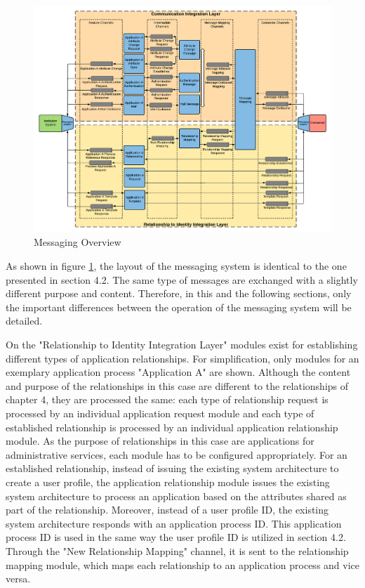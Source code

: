 \begin{figure}[h]
    \centering
    \includegraphics[scale=0.45]{Diagrams/Integration Architecture 2/Technological Integration/2. Messaging Overview.pdf}
    \caption{Messaging Overview}
    \label{integration2:messaging_overview}
\end{figure}

As shown in figure \ref{integration2:messaging_overview}, the layout of the messaging system is identical to the one presented in section 4.2. The same type of messages are exchanged with a slightly different purpose and content. Therefore, in this and the following sections, only the important differences between the operation of the messaging system will be detailed.

On the "Relationship to Identity Integration Layer" modules exist for establishing different types of application relationships. For simplification, only modules for an exemplary application process "Application A" are shown. Although the content and purpose of the relationships in this case are different to the relationships of chapter 4, they are processed the same: each type of relationship request is processed by an individual application request module and each type of established relationship is processed by an individual application relationship module. As the purpose of relationships in this case are applications for administrative services, each module has to be configured appropriately. For an established relationship, instead of issuing the existing system architecture to create a user profile, the application relationship module issues the existing system architecture to process an application based on the attributes shared as part of the relationship. Moreover, instead of a user profile ID, the existing system architecture responds with an application process ID. This application process ID is used in the same way the user profile ID is utilized in section 4.2. Through the "New Relationship Mapping" channel, it is sent to the relationship mapping module, which maps each relationship to an application process and vice versa.

